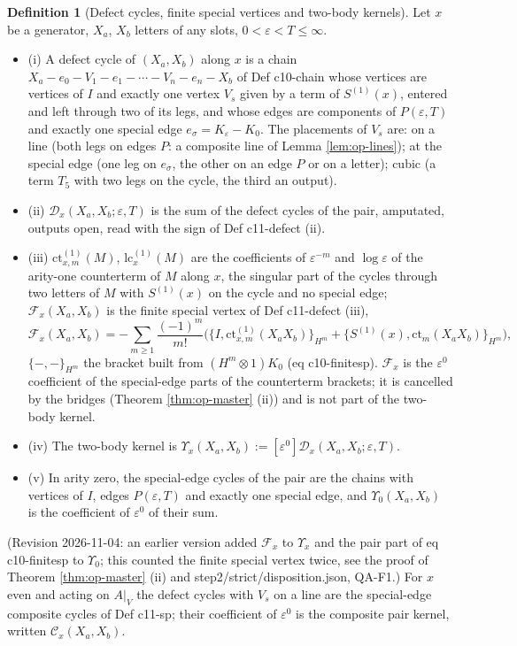 \documentclass[11pt]{article}
\numberwithin{equation}{section}
\theoremstyle{plain}
\theoremstyle{definition}
\newtheorem{definition}[theorem]{Definition}
\newcommand{\AV}{A|_V}
\newcommand{\lc}{\mathrm{lc}}
\newcommand{\ct}{\mathrm{ct}}
\newcommand{\Comp}{\mathcal C}
\begin{document}
\begin{definition}[Defect cycles, finite special vertices and two-body kernels]
\label{def:op-defect}
Let $x$ be a generator, $X_a$, $X_b$ letters of any slots, $0<\varepsilon<T\le\infty$.
\begin{itemize}
\item (i) A defect cycle of $(X_a,X_b)$ along $x$ is a chain $X_a-e_0-V_1-e_1-\cdots-V_n-e_n-X_b$ of Def c10-chain whose vertices are vertices of $I$ and exactly one vertex $V_s$ given by a term of $S^{(1)}(x)$, entered and left through two of its legs, and whose edges are components of $P(\varepsilon,T)$ and exactly one special edge $e_\sigma=K_\varepsilon-K_0$. The placements of $V_s$ are: on a line (both legs on edges $P$: a composite line of Lemma \ref{lem:op-lines}); at the special edge (one leg on $e_\sigma$, the other on an edge $P$ or on a letter); cubic (a term $T_5$ with two legs on the cycle, the third an output).
\item (ii) $\mathcal D_x(X_a,X_b;\varepsilon,T)$ is the sum of the defect cycles of the pair, amputated, outputs open, read with the sign of Def c11-defect (ii).
\item (iii) $\ct^{(1)}_{x,m}(M)$, $\lc^{(1)}_x(M)$ are the coefficients of $\varepsilon^{-m}$ and $\log\varepsilon$ of the arity-one counterterm of $M$ along $x$, the singular part of the cycles through two letters of $M$ with $S^{(1)}(x)$ on the cycle and no special edge; $\mathcal F_x(X_a,X_b)$ is the finite special vertex of Def c11-defect (iii),
\[
\mathcal F_x(X_a,X_b)=-\sum_{m\ge1}\frac{(-1)^m}{m!}\Big(\big\{I,\ct^{(1)}_{x,m}(X_aX_b)\big\}_{H^m}+\big\{S^{(1)}(x),\ct_m(X_aX_b)\big\}_{H^m}\Big),
\]
$\{-,-\}_{H^m}$ the bracket built from $(H^m\otimes1)K_0$ (eq c10-finitesp). $\mathcal F_x$ is the $\varepsilon^0$ coefficient of the special-edge parts of the counterterm brackets; it is cancelled by the bridges (Theorem \ref{thm:op-master} (ii)) and is not part of the two-body kernel.
\item (iv) The two-body kernel is $\Upsilon_x(X_a,X_b):=[\varepsilon^0]\mathcal D_x(X_a,X_b;\varepsilon,T)$.
\item (v) In arity zero, the special-edge cycles of the pair are the chains with vertices of $I$, edges $P(\varepsilon,T)$ and exactly one special edge, and $\Upsilon_0(X_a,X_b)$ is the coefficient of $\varepsilon^0$ of their sum.
\end{itemize}
(Revision 2026-11-04: an earlier version added $\mathcal F_x$ to $\Upsilon_x$ and the pair part of eq c10-finitesp to $\Upsilon_0$; this counted the finite special vertex twice, see the proof of Theorem \ref{thm:op-master} (ii) and step2/strict/disposition.json, QA-F1.)
For $x$ even and acting on $\AV$ the defect cycles with $V_s$ on a line are the special-edge composite cycles of Def c11-sp; their coefficient of $\varepsilon^0$ is the composite pair kernel, written $\Comp_x(X_a,X_b)$.
\end{definition}
\end{document}
